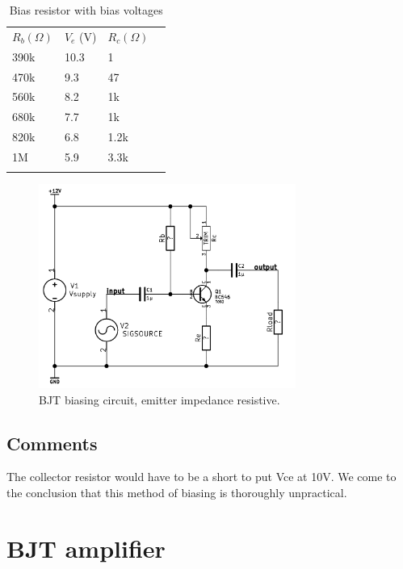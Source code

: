 \documentclass[11pt,a4paper]{article}
\begin{document}
\begin{longtable}[c]{@{}llll@{}}
\toprule\addlinespace
$R_{b}  (\Omega)$ & $V_{e}$ (V) & $R_{c}  (\Omega)$
\\\addlinespace
\midrule\endhead
390k & 10.3 & 1
\\\addlinespace
470k & 9.3 & 47
\\\addlinespace
560k & 8.2 & 1k
\\\addlinespace
680k & 7.7 & 1k
\\\addlinespace
820k & 6.8 & 1.2k
\\\addlinespace
1M & 5.9 & 3.3k
\\\addlinespace
\bottomrule
\addlinespace
\caption{Bias resistor with bias voltages}
\end{longtable}

\begin{figure}[htbp]
    \centering
    \includegraphics[width=0.75\textwidth]{img/bjt-bias_1.png}
    \caption{BJT biasing circuit, emitter impedance resistive.}
    \label{fig:bjt-bias_1}
\end{figure}

\subsection{Comments}\label{comments}
The collector resistor would have to be a short to put Vce at 10V. 
We come to the conclusion that this method of biasing is thoroughly unpractical.


\section{BJT amplifier}\label{bjt-amplifier}
\end{document}
